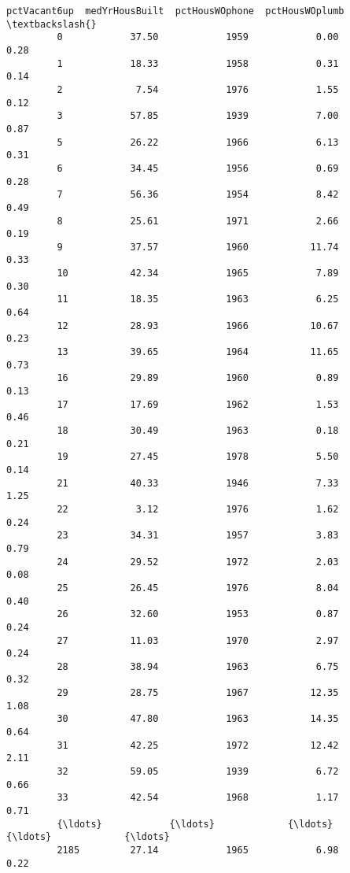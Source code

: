 \documentclass[11pt]{llncs}
\begin{document}
\begin{Verbatim}[commandchars=\\\{\}]
               pctVacant6up  medYrHousBuilt  pctHousWOphone  pctHousWOplumb  \textbackslash{}
         0            37.50            1959            0.00            0.28   
         1            18.33            1958            0.31            0.14   
         2             7.54            1976            1.55            0.12   
         3            57.85            1939            7.00            0.87   
         5            26.22            1966            6.13            0.31   
         6            34.45            1956            0.69            0.28   
         7            56.36            1954            8.42            0.49   
         8            25.61            1971            2.66            0.19   
         9            37.57            1960           11.74            0.33   
         10           42.34            1965            7.89            0.30   
         11           18.35            1963            6.25            0.64   
         12           28.93            1966           10.67            0.23   
         13           39.65            1964           11.65            0.73   
         16           29.89            1960            0.89            0.13   
         17           17.69            1962            1.53            0.46   
         18           30.49            1963            0.18            0.21   
         19           27.45            1978            5.50            0.14   
         21           40.33            1946            7.33            1.25   
         22            3.12            1976            1.62            0.24   
         23           34.31            1957            3.83            0.79   
         24           29.52            1972            2.03            0.08   
         25           26.45            1976            8.04            0.40   
         26           32.60            1953            0.87            0.24   
         27           11.03            1970            2.97            0.24   
         28           38.94            1963            6.75            0.32   
         29           28.75            1967           12.35            1.08   
         30           47.80            1963           14.35            0.64   
         31           42.25            1972           12.42            2.11   
         32           59.05            1939            6.72            0.66   
         33           42.54            1968            1.17            0.71   
         {\ldots}            {\ldots}             {\ldots}             {\ldots}             {\ldots}   
         2185         27.14            1965            6.98            0.22   

\end{Verbatim}
\end{document}
